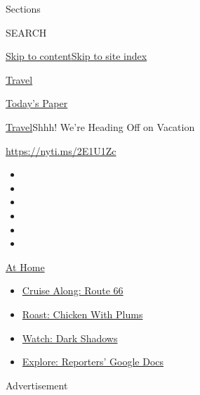 Sections

SEARCH

\protect\hyperlink{site-content}{Skip to
content}\protect\hyperlink{site-index}{Skip to site index}

\href{https://www.nytimes3xbfgragh.onion/section/travel}{Travel}

\href{https://myaccount.nytimes3xbfgragh.onion/auth/login?response_type=cookie\&client_id=vi}{}

\href{https://www.nytimes3xbfgragh.onion/section/todayspaper}{Today's
Paper}

\href{/section/travel}{Travel}\textbar{}Shhh! We're Heading Off on
Vacation

\url{https://nyti.ms/2E1U1Zc}

\begin{itemize}
\item
\item
\item
\item
\item
\item
\end{itemize}

\href{https://www.nytimes3xbfgragh.onion/spotlight/at-home?action=click\&pgtype=Article\&state=default\&region=TOP_BANNER\&context=at_home_menu}{At
Home}

\begin{itemize}
\tightlist
\item
  \href{https://www.nytimes3xbfgragh.onion/2020/09/07/travel/route-66.html?action=click\&pgtype=Article\&state=default\&region=TOP_BANNER\&context=at_home_menu}{Cruise
  Along: Route 66}
\item
  \href{https://www.nytimes3xbfgragh.onion/2020/09/04/dining/sheet-pan-chicken.html?action=click\&pgtype=Article\&state=default\&region=TOP_BANNER\&context=at_home_menu}{Roast:
  Chicken With Plums}
\item
  \href{https://www.nytimes3xbfgragh.onion/2020/09/04/arts/television/dark-shadows-stream.html?action=click\&pgtype=Article\&state=default\&region=TOP_BANNER\&context=at_home_menu}{Watch:
  Dark Shadows}
\item
  \href{https://www.nytimes3xbfgragh.onion/interactive/2020/at-home/even-more-reporters-editors-diaries-lists-recommendations.html?action=click\&pgtype=Article\&state=default\&region=TOP_BANNER\&context=at_home_menu}{Explore:
  Reporters' Google Docs}
\end{itemize}

Advertisement

